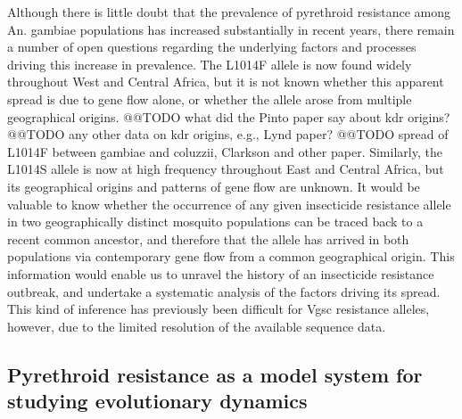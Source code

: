 \documentclass[a4paper,11pt,abstracton,hidelinks]{scrartcl}
\begin{document}
%
Although there is little doubt that the prevalence of pyrethroid resistance among An. gambiae populations has increased substantially in recent years, there remain a number of open questions regarding the underlying factors and processes driving this increase in prevalence.
%
The L1014F allele is now found widely throughout West and Central Africa, but it is not known whether this apparent spread is due to gene flow alone, or whether the allele arose from multiple geographical origins.
%
@@TODO what did the Pinto paper say about kdr origins? @@TODO any other data on kdr origins, e.g., Lynd paper?
%
@@TODO spread of L1014F between gambiae and coluzzii, Clarkson and other paper.
%
Similarly, the L1014S allele is now at high frequency throughout East and Central Africa, but its geographical origins and patterns of gene flow are unknown.
%
It would be valuable to know whether the occurrence of any given insecticide resistance allele in two geographically distinct mosquito populations can be traced back to a recent common ancestor, and therefore that the allele has arrived in both populations via contemporary gene flow from a common geographical origin.
%
This information would enable us to unravel the history of an insecticide resistance outbreak, and undertake a systematic analysis of the factors driving its spread.
%
This kind of inference has previously been difficult for Vgsc resistance alleles, however, due to the limited resolution of the available sequence data.


\subsection*{Pyrethroid resistance as a model system for studying evolutionary dynamics}
\end{document}
